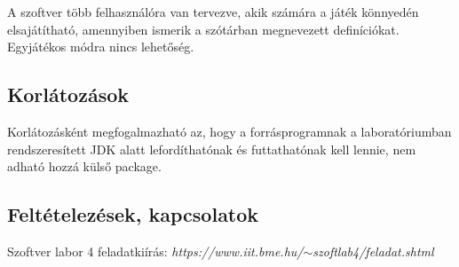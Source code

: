 A szoftver több felhasználóra van tervezve, akik számára a játék könnyedén elsajátítható, amennyiben ismerik a szótárban megnevezett definíciókat. Egyjátékos módra nincs lehetőség.

\subsection{Korlátozások}

Korlátozásként megfogalmazható az, hogy a forrásprogramnak a laboratóriumban rendszeresített JDK alatt lefordíthatónak és futtathatónak kell lennie, nem adható hozzá külső package.

\subsection{Feltételezések, kapcsolatok}

Szoftver labor 4 feladatkiírás: \textit{https://www.iit.bme.hu/$\sim$szoftlab4/feladat.shtml}